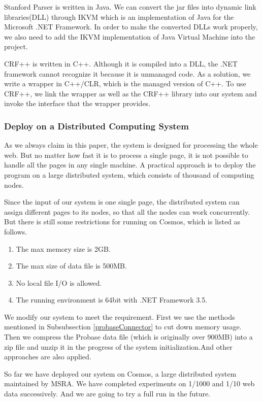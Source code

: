 Stanford Parser is written in Java.
We can convert the jar files into dynamic link libraries(DLL) through IKVM\cite{ikvmWebsite} which is an implementation of Java for the Microsoft .NET Framework.
In order to make the converted DLLs work properly, we also need to add the IKVM implementation of Java Virtual Machine into the project.

CRF++ is written in C++. Although it is compiled into a DLL, the .NET framework cannot recognize it because it is unmanaged code. As a solution, we write a wrapper in C++/CLR, which is the managed version of C++. To use CRF++, we link the wrapper as well as the CRF++ library into our system and invoke the interface that the wrapper provides.

\subsubsection{Deploy on a Distributed Computing System}
As we always claim in this paper, the system is designed for processing the whole web. But no matter how fast it is to process a single page, it is not possible to handle all the pages in any single machine. A practical approach is to deploy the program on a large distributed system, which consists of thousand of computing nodes.

Since the input of our system is one single page, the distributed system can assign different pages to its nodes, so that all the nodes can work concurrently.
But there is still some restrictions for running on Cosmos, which is listed as follows.
\begin{enumerate}
  \item The max memory size is 2GB.
  \item The max size of data file is 500MB.
  \item No local file I/O is allowed.
  \item The running environment is 64bit with .NET Framework 3.5.
\end{enumerate}

We modify our system to meet the requirement. First we use the methods mentioned in Subsubsection \ref{probaseConnector} to cut down memory usage. Then we compress the Probase data file (which is originally over 900MB) into a zip file and unzip it in the progress of the system initialization.And other approaches are also applied.

So far we have deployed our system on Cosmos, a large distributed system maintained by MSRA. We have completed experiments on 1/1000 and 1/10 web data successively. And we are going to try a full run in the future.




